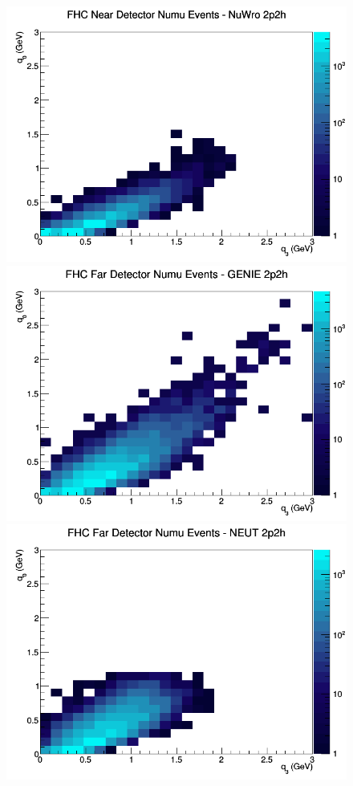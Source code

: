 \documentclass[12pt]{article}
\begin{document}
\begin{figure}[h]
\includegraphics[width=\linewidth]{eff_q0_q3/LAr/2p2h_FHC_ND_numu_q3_q0_NuWro.png}
\endminipage
\newline
{}
\includegraphics[width=\linewidth]{eff_q0_q3/LAr/2p2h_FHC_FD_numu_q3_q0_GENIE.png}
\endminipage
{}
\includegraphics[width=\linewidth]{eff_q0_q3/LAr/2p2h_FHC_FD_numu_q3_q0_NEUT.png}

\end{figure}
\end{document}
